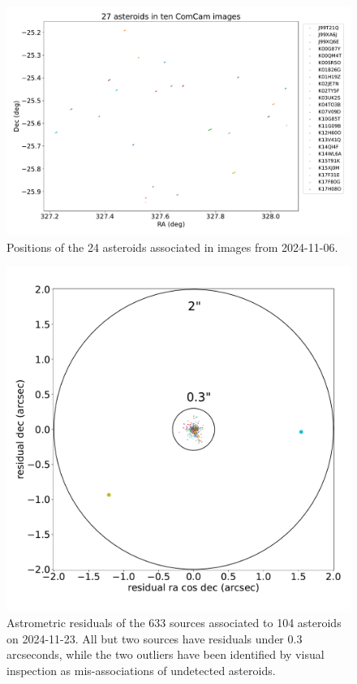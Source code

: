 \begin{figure}
  \label{fig:solar_system_positions}
  \includegraphics[width=\textwidth]{sso_figures/24_asteroids.pdf}
  \caption{Positions of the 24 asteroids associated in images from 2024-11-06.}
\end{figure}

\begin{figure}
  \label{fig:solar_system_residuals}
  \includegraphics[width=\textwidth]{sso_figures/sso_residuals.pdf}
  \caption{Astrometric residuals of the 633 sources associated to 104 asteroids on 2024-11-23. All but two sources have residuals under 0.3 arcseconds, while the two outliers have been identified by visual inspection as mis-associations of undetected asteroids.}
\end{figure}

